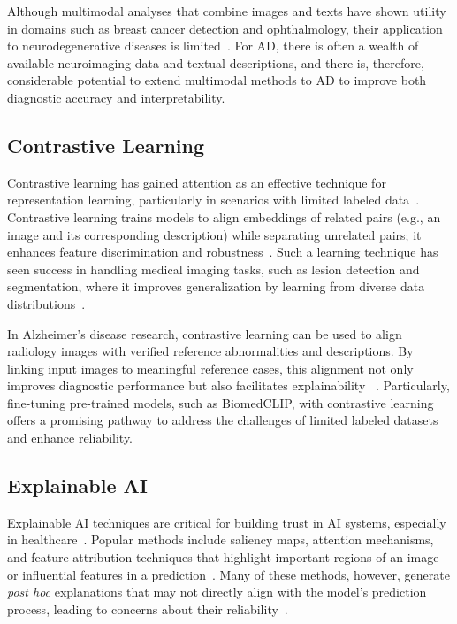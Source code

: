 Although multimodal analyses that combine images and texts have shown utility in domains such as breast cancer detection and ophthalmology, their application to neurodegenerative diseases is limited~\cite{nakach2024comprehensive, qian2024multimodal, abdullakutty2024histopathology, xu2022multi, wang2024advances, mihalache2024accuracy}. For AD, there is often a wealth of available neuroimaging data and textual descriptions, and there is, therefore, considerable potential to extend multimodal methods to AD to improve both diagnostic accuracy and interpretability.

\subsection{Contrastive Learning}
Contrastive learning has gained attention as an effective technique for representation learning, particularly in scenarios with limited labeled data~\cite{chen2020simple, he2020momentum}. Contrastive learning trains models to align embeddings of related pairs (e.g., an image and its corresponding description) while separating unrelated pairs; it enhances feature discrimination and robustness~\cite{zhang2022contrastive}. Such a learning technique has seen success in handling medical imaging tasks, such as lesion detection and segmentation, where it improves generalization by learning from diverse data distributions~\cite{azizi2021big, chaitanya2020contrastive, krishnan2022self, zang2021scehr}.

In Alzheimer's disease research, contrastive learning can be used to align radiology images with verified reference abnormalities and descriptions. By linking input images to meaningful reference cases, this alignment not only improves diagnostic performance but also facilitates explainability ~\cite{zhang2024biomedclip}. Particularly, fine-tuning pre-trained models, such as BiomedCLIP, with contrastive learning offers a promising pathway to address the challenges of limited labeled datasets and enhance reliability.

\subsection{Explainable AI}
Explainable AI techniques are critical for building trust in AI systems, especially in healthcare~\cite{holzinger2018machine, amann2020explainability, sadeghi2024review, molnar2020interpretable}. Popular methods include saliency maps, attention mechanisms, and feature attribution techniques that highlight important regions of an image or influential features in a prediction~\cite{tjoa2020survey, lundberg2020local, scott2017unified, li2023deep, borys2023explainable, wollek2023attention}. Many of these methods, however, generate \textit{post hoc} explanations that may not directly align with the model's prediction process, leading to concerns about their reliability~\cite{ghassemi2021false, arrieta2020explainable}.


